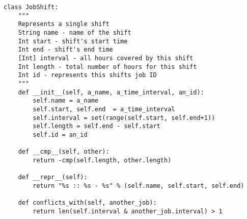 \documentclass[11pt]{article}
\theoremstyle{definition}
\begin{document}
\begin{lstlisting}
class JobShift:
    """
    Represents a single shift
    String name - name of the shift
    Int start - shift's start time
    Int end - shift's end time
    [Int] interval - all hours covered by this shift
    Int length - total number of hours for this shift
    Int id - represents this shifts job ID
    """
    def __init__(self, a_name, a_time_interval, an_id):
        self.name = a_name
        self.start, self.end  = a_time_interval
        self.interval = set(range(self.start, self.end+1))
        self.length = self.end - self.start
        self.id = an_id

    def __cmp__(self, other):
        return -cmp(self.length, other.length)

    def __repr__(self):
        return "%s :: %s - %s" % (self.name, self.start, self.end)

    def conflicts_with(self, another_job):
        return len(self.interval & another_job.interval) > 1

\end{lstlisting}
\end{document}
